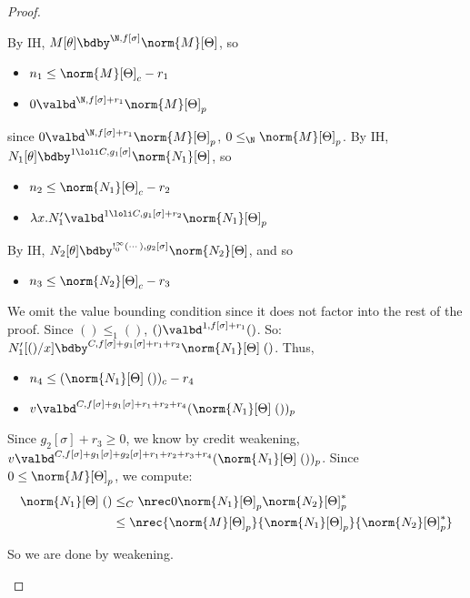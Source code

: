 \begin{proof}
\begin{itemize}
By IH, $M[\theta] \bdby^{\N,f[\sigma]} \norm{M}[\Theta]$, so
\begin{itemize}
  \item $n_1 \leq \norm{M}[\Theta]_c - r_1$
  \item $0 \valbd^{\N,f[\sigma] + r_1} \norm{M}[\Theta]_p$
\end{itemize}
since $0 \valbd^{\N,f[\sigma] + r_1} \norm{M}[\Theta]_p$, $0 \leq_\N \norm{M}[\Theta]_p$. 
By IH, $N_1 [\theta] \bdby^{1 \loli C,g_1[\sigma]} \norm{N_1}[\Theta]$, so
\begin{itemize}
  \item $n_2 \leq \norm{N_1}[\Theta]_c - r_2$
  \item $\lambda x.N_1' \valbd^{1 \loli C,g_1[\sigma] + r_2} \norm{N_1}[\Theta]_p$
\end{itemize}
By IH, $N_2[\theta] \bdby^{!^\infty_0(\cdots),g_2[\sigma]} \norm{N_2}[\Theta]$, and so
\begin{itemize}
  \item $n_3 \leq \norm{N_2}[\Theta]_c - r_3$
\end{itemize}
We omit the value bounding condition since it does not factor into the rest of the proof. Since $() \leq_1 ()$, $() \valbd^{1,f[\sigma] + r_1} ()$. So: $N_1'[()/x] \bdby^{C,f[\sigma] + g_1[\sigma] + r_1 + r_2} \norm{N_1}[\Theta] \; ()$. Thus,
\begin{itemize}
  \item $n_4 \leq (\norm{N_1}[\Theta] \; ())_c - r_4$
  \item $v \valbd^{C,f[\sigma] + g_1[\sigma] + r_1 + r_2 + r_4} (\norm{N_1}[\Theta] \; ())_p$
\end{itemize}
Since $g_2[\sigma] + r_3 \geq 0$, we know by credit weakening, $v \valbd^{C,f[\sigma] + g_1[\sigma] + g_2[\sigma] + r_1 + r_2 + r_3 + r_4} (\norm{N_1}[\Theta] \; ())_p$.
Since $0 \leq \norm{M}[\Theta]_p$, we compute: 
\begin{align*}
\norm{N_1}[\Theta] \; () &\leq_C \nrec 0 {\norm{N_1}[\Theta]_p} {\norm{N_2}[\Theta]_p^*}\\
&\leq \nrec {\norm{M}[\Theta]_p} {\norm{N_1}[\Theta]_p} {\norm{N_2}[\Theta]_p^*}
\end{align*}

So we are done by weakening.\\


\end{itemize}
\end{proof}
